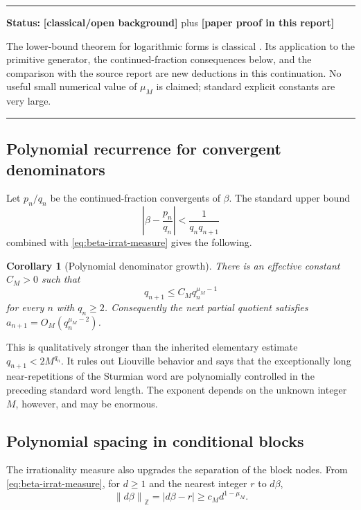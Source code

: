 \documentclass[11pt,oneside]{article}
\newtheorem{corollary}[theorem]{Corollary}
\theoremstyle{definition}
\theoremstyle{remark}
\newcommand{\Z}{\mathbb Z}
\newcommand{\distZ}[1]{\left\lVert #1\right\rVert_{\Z}}
\newcommand{\statusnew}{\textcolor{newgreen}{\textbf{[paper proof in this report]}}}
\newcommand{\statusknown}{\textcolor{classicalgray}{\textbf{[classical/open background]}}}
\newenvironment{statusbox}[1]
{\begin{center}\begin{minipage}{0.94\textwidth}\raggedright\hbadness=10000\hrule
\vspace{0.45em}\textbf{Status:} #1\par\vspace{0.35em}}
{\vspace{0.35em}\hrule\end{minipage}\end{center}}
\begin{document}
\begin{statusbox}{\statusknown{} plus \statusnew}
The lower-bound theorem for logarithmic forms is classical
\cite{Baker1975,BakerWustholz1993,Matveev2000}.  Its application to the primitive generator,
the continued-fraction consequences below, and the comparison with the source report are
new deductions in this continuation.  No useful small numerical value of $\mu_M$ is claimed;
standard explicit constants are very large.
\end{statusbox}

\subsection{Polynomial recurrence for convergent denominators}

Let $p_n/q_n$ be the continued-fraction convergents of $\beta$.  The standard upper bound
\[
  \left|\beta-\frac{p_n}{q_n}\right|<\frac1{q_nq_{n+1}}
\]
combined with \eqref{eq:beta-irrat-measure} gives the following.

\begin{corollary}[Polynomial denominator growth]\label{cor:q-growth}
There is an effective constant $C_M>0$ such that
\begin{equation}\label{eq:q-growth}
  q_{n+1}\le C_M q_n^{\mu_M-1}
\end{equation}
for every $n$ with $q_n\ge2$.  Consequently the next partial quotient satisfies
$a_{n+1}=O_M(q_n^{\mu_M-2})$.
\end{corollary}

This is qualitatively stronger than the inherited elementary estimate
$q_{n+1}<2M^{q_n}$.  It rules out Liouville behavior and says that the exceptionally long
near-repetitions of the Sturmian word are polynomially controlled in the preceding standard
word length.  The exponent depends on the unknown integer $M$, however, and may be enormous.

\subsection{Polynomial spacing in conditional blocks}

The irrationality measure also upgrades the separation of the block nodes.  From
\eqref{eq:beta-irrat-measure}, for $d\ge1$ and the nearest integer $r$ to $d\beta$,
\begin{equation}\label{eq:beta-mod-one}
  \distZ{d\beta}=|d\beta-r|
  \ge c_M d^{1-\mu_M}.
\end{equation}
\end{document}
